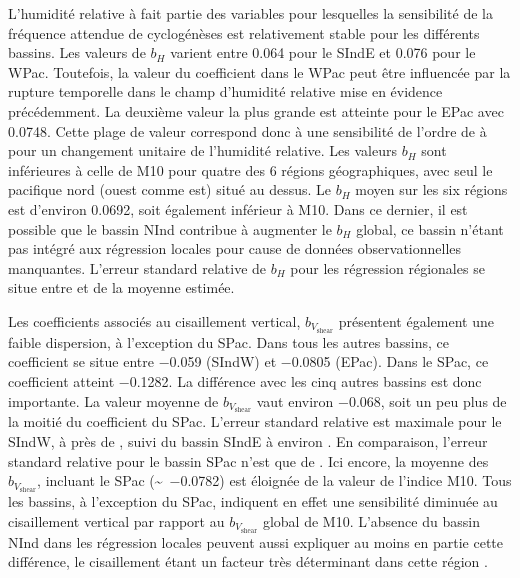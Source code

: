 \documentclass[../main.tex]{subfiles}
\begin{document}
L'humidité relative à  fait partie des variables pour lesquelles la sensibilité de la fréquence attendue de cyclogénèses est relativement stable pour
les différents bassins. Les valeurs de $b_H$ varient entre \num{0.064} pour le SIndE et \num{0.076} pour le WPac. Toutefois, la valeur du coefficient dans le
WPac peut être influencée par la rupture temporelle dans le champ d'humidité relative mise en évidence précédemment. La deuxième valeur la plus grande est
atteinte pour le EPac avec \num{0.0748}. Cette plage de valeur correspond donc à une sensibilité de l'ordre de  à  pour un changement
unitaire de l'humidité relative. Les valeurs $b_H$ sont inférieures à celle de M10 pour quatre des 6 régions géographiques, avec seul le pacifique nord (ouest
comme est) situé au dessus. Le $b_H$ moyen sur les six régions est d'environ \num{0.0692}, soit également inférieur à M10. Dans ce dernier, il est possible que
le bassin NInd contribue à augmenter le $b_H$ global, ce bassin n'étant pas intégré aux régression locales pour cause de données observationnelles manquantes.
L'erreur standard relative de $b_H$ pour les régression régionales se situe entre  et  de la moyenne estimée.

Les coefficients associés au cisaillement vertical, $b_{V_{\mathrm{shear}}}$ présentent également une faible dispersion, à l'exception du SPac. Dans tous les
autres bassins, ce coefficient se situe entre \num{-0.059} (SIndW) et \num{-0.0805} (EPac). Dans le SPac, ce coefficient atteint \num{-0.1282}. La différence
avec les cinq autres bassins est donc importante. La valeur moyenne de $b_{V_{\mathrm{shear}}}$ vaut environ \num{-0.068}, soit un peu plus de la moitié du
coefficient du SPac. L'erreur standard relative est maximale pour le SIndW, à près de , suivi du bassin SIndE à environ . En comparaison,
l'erreur standard relative pour le bassin SPac n'est que de . Ici encore, la moyenne des $b_{V_{\mathrm{shear}}}$, incluant le SPac
(\sim~\num{-0.0782}) est éloignée de la valeur de l'indice M10. Tous les bassins, à l'exception du SPac, indiquent en effet une sensibilité diminuée au
cisaillement vertical par rapport au $b_{V_{\mathrm{shear}}}$ global de M10. L'absence du bassin NInd dans les régression locales peuvent aussi expliquer au
moins en partie cette différence, le cisaillement étant un facteur très déterminant dans cette région \parencite{gray_global_1968}.
\end{document}
